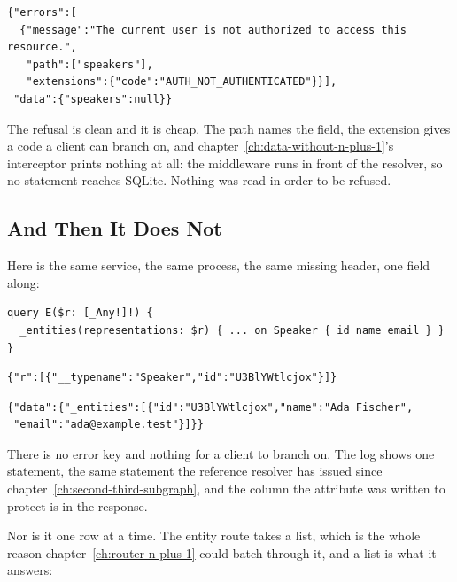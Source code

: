\begin{verbatim}
{"errors":[
  {"message":"The current user is not authorized to access this resource.",
   "path":["speakers"],
   "extensions":{"code":"AUTH_NOT_AUTHENTICATED"}}],
 "data":{"speakers":null}}
\end{verbatim}

%
The refusal is clean and it is cheap. The path names the field, the extension
gives a code a client can branch on, and
chapter~\ref{ch:data-without-n-plus-1}'s interceptor prints nothing at all:
the middleware runs in front of the resolver, so no statement reaches SQLite.
Nothing was read in order to be refused.

\subsection{And Then It Does Not}

%
Here is the same service, the same process, the same missing header, one
field along:

\begin{verbatim}
query E($r: [_Any!]!) {
  _entities(representations: $r) { ... on Speaker { id name email } }
}
\end{verbatim}

\begin{verbatim}
{"r":[{"__typename":"Speaker","id":"U3BlYWtlcjox"}]}
\end{verbatim}

\begin{verbatim}
{"data":{"_entities":[{"id":"U3BlYWtlcjox","name":"Ada Fischer",
 "email":"ada@example.test"}]}}
\end{verbatim}

%
There is no error key and nothing for a client to branch on. The log shows
one statement, the same statement the reference resolver has issued since
chapter~\ref{ch:second-third-subgraph}, and the column the attribute was
written to protect is in the response.

%
Nor is it one row at a time. The entity route takes a list, which is the
whole reason chapter~\ref{ch:router-n-plus-1} could batch through it, and a
list is what it answers:

